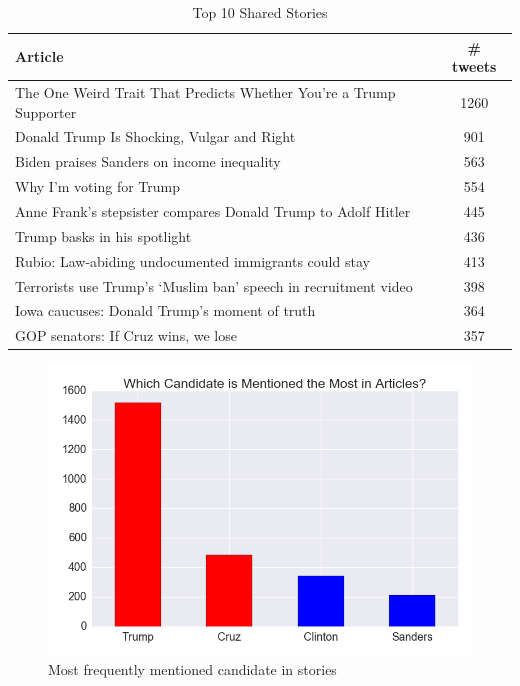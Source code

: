 \documentclass[letterpaper]{article}
\begin{document}
{ 
\begin{table}
\begin{tabular}{ |l c| } 
    \hline
    Article &  \# tweets \\
    \hline
    The One Weird Trait That Predicts Whether You're a Trump Supporter &   1260 \\
    Donald Trump Is Shocking, Vulgar and Right                         &    901 \\
    Biden praises Sanders on income inequality                         &    563 \\
    Why I'm voting for Trump                                           &    554 \\
    Anne Frank's stepsister compares Donald Trump to Adolf Hitler      &    445 \\
    Trump basks in his spotlight                                       &    436 \\
    Rubio: Law-abiding undocumented immigrants could stay              &    413 \\
    Terrorists use Trump's `Muslim ban' speech in recruitment video    &    398 \\
    Iowa caucuses: Donald Trump's moment of truth                      &    364 \\
    GOP senators: If Cruz wins, we lose                                &    357 \\
    \hline
\end{tabular}
\caption{\label{tab:top-10}Top 10 Shared Stories}
\end{table}

\begin{figure}[t!]  
\centering 
  \includegraphics[width=\columnwidth]{candidate-mentions}  
  \caption{Most frequently mentioned candidate in stories
    \label{fig:tweets-by-pub}}
\end{figure} 


}
\end{document}
